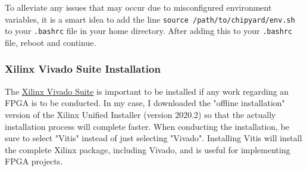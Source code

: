 \documentclass{article}
\begin{document}
	To alleviate any issues that may occur due to misconfigured environment variables, it is a smart idea to add the line \texttt{source /path/to/chipyard/env.sh} to your \texttt{.bashrc} file in your home directory. After adding this to your \texttt{.bashrc} file, reboot and continue.
	
	\subsubsection{Xilinx Vivado Suite Installation}
	The \hyperref{https://www.xilinx.com/support/download.html}{}{}{Xilinx Vivado Suite} is important to be installed if any work regarding an FPGA is to be conducted. In my case, I downloaded the "offline installation" version of the Xilinx Unified Installer (version 2020.2) so that the actually installation process will complete faster. When conducting the installation, be sure to select "Vitis" instead of just selecting "Vivado". Installing Vitis will install the complete Xilinx package, including Vivado, and is useful for implementing FPGA projects.
	
	
	
	
\end{document}
